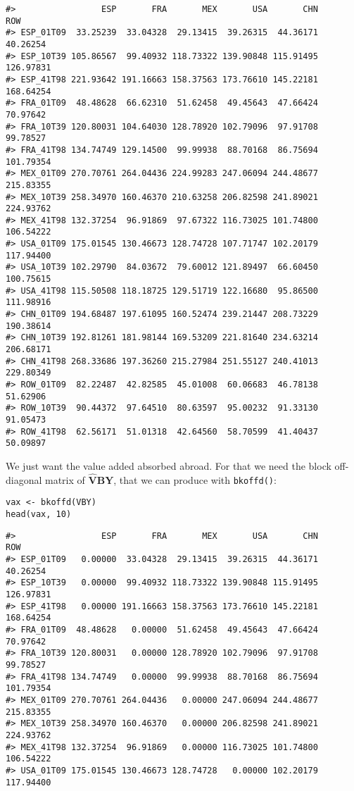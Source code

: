 \begin{verbatim}
#>                 ESP       FRA       MEX       USA       CHN       ROW
#> ESP_01T09  33.25239  33.04328  29.13415  39.26315  44.36171  40.26254
#> ESP_10T39 105.86567  99.40932 118.73322 139.90848 115.91495 126.97831
#> ESP_41T98 221.93642 191.16663 158.37563 173.76610 145.22181 168.64254
#> FRA_01T09  48.48628  66.62310  51.62458  49.45643  47.66424  70.97642
#> FRA_10T39 120.80031 104.64030 128.78920 102.79096  97.91708  99.78527
#> FRA_41T98 134.74749 129.14500  99.99938  88.70168  86.75694 101.79354
#> MEX_01T09 270.70761 264.04436 224.99283 247.06094 244.48677 215.83355
#> MEX_10T39 258.34970 160.46370 210.63258 206.82598 241.89021 224.93762
#> MEX_41T98 132.37254  96.91869  97.67322 116.73025 101.74800 106.54222
#> USA_01T09 175.01545 130.46673 128.74728 107.71747 102.20179 117.94400
#> USA_10T39 102.29790  84.03672  79.60012 121.89497  66.60450 100.75615
#> USA_41T98 115.50508 118.18725 129.51719 122.16680  95.86500 111.98916
#> CHN_01T09 194.68487 197.61095 160.52474 239.21447 208.73229 190.38614
#> CHN_10T39 192.81261 181.98144 169.53209 221.81640 234.63214 206.68171
#> CHN_41T98 268.33686 197.36260 215.27984 251.55127 240.41013 229.80349
#> ROW_01T09  82.22487  42.82585  45.01008  60.06683  46.78138  51.62906
#> ROW_10T39  90.44372  97.64510  80.63597  95.00232  91.33130  91.05473
#> ROW_41T98  62.56171  51.01318  42.64560  58.70599  41.40437  50.09897
\end{verbatim}

We just want the value added absorbed abroad. For that we need the block
off-diagonal matrix of \(\mathbf{\hat{V}BY}\), that we can produce with
\texttt{bkoffd()}:

\begin{verbatim}
vax <- bkoffd(VBY)
head(vax, 10)
\end{verbatim}

\begin{verbatim}
#>                 ESP       FRA       MEX       USA       CHN       ROW
#> ESP_01T09   0.00000  33.04328  29.13415  39.26315  44.36171  40.26254
#> ESP_10T39   0.00000  99.40932 118.73322 139.90848 115.91495 126.97831
#> ESP_41T98   0.00000 191.16663 158.37563 173.76610 145.22181 168.64254
#> FRA_01T09  48.48628   0.00000  51.62458  49.45643  47.66424  70.97642
#> FRA_10T39 120.80031   0.00000 128.78920 102.79096  97.91708  99.78527
#> FRA_41T98 134.74749   0.00000  99.99938  88.70168  86.75694 101.79354
#> MEX_01T09 270.70761 264.04436   0.00000 247.06094 244.48677 215.83355
#> MEX_10T39 258.34970 160.46370   0.00000 206.82598 241.89021 224.93762
#> MEX_41T98 132.37254  96.91869   0.00000 116.73025 101.74800 106.54222
#> USA_01T09 175.01545 130.46673 128.74728   0.00000 102.20179 117.94400
\end{verbatim}

